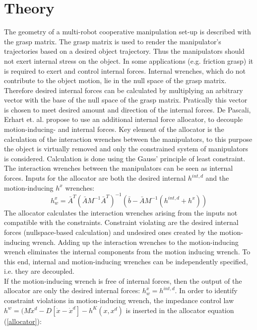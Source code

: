 \documentclass[conference]{IEEEtran}
\begin{document}
\section{Theory}
The geometry of a multi-robot cooperative manipulation set-up is described with the grasp matrix. The grasp matrix is used to render the manipulator's trajectories based on a desired object trajectory. Thus the manipulators should not exert internal stress on the object. In some applications (e.g. friction grasp) it is required to exert and control internal forces. Internal wrenches, which do not contribute to the object motion, lie in the null space of the grasp matrix. Therefore desired internal forces can be calculated by multiplying an arbitrary vector with the base of the null space of the grasp matrix. Pratically this vector is chosen to meet desired amount and direction of the internal forces.
De Pascali, Erhart et. al. propose to use an additional internal force allocator, to decouple motion-inducing- and internal forces. Key element of the allocator is the calculation of the interaction wrenches between the manipulators, to this purpose the object is virtually removed and only the constrained system of manipulators is considered. Calculation is done using the Gauss' principle of least constraint. The interaction wrenches between the manipulators can be seen as internal forces. Inputs for the allocator are both the desired internal $ h^{int,d} $ and the motion-inducing $ h^x $ wrenches:
\begin{equation}
h_w^{x} = \bar{A}^T(\bar{A}M^{-1}\bar{A}^T)^{-1}(\bar{b}-\bar{A}M^{-1}(h^{int,d}+h^x))
\label{allocator}
\end{equation}
The allocator calculates the interaction wrenches arising from the inputs not compatible with the constraints. Constraint violating are the desired internal forces (nullspace-based calculation) and undesired ones created by the motion-inducing wrench. Adding up the interaction wrenches to the motion-inducing wrench eliminates the internal components from the motion inducing wrench. To this end, internal and motion-inducing wrenches can be independently specified, i.e. they are decoupled.\\
If the motion-inducing wrench is free of internal forces, then the output of the allocator are only the desired internal forces: $ h_w^x = h^{int,d} $. In order to identify constraint violations in motion-inducing wrench, the impedance control law $ h^w = (M\ddot{x}^d - D[\dot{x}-\dot{x}^d] - h^K(x,x^d) $ is inserted in the allocator equation (\ref{allocator}):
\end{document}
